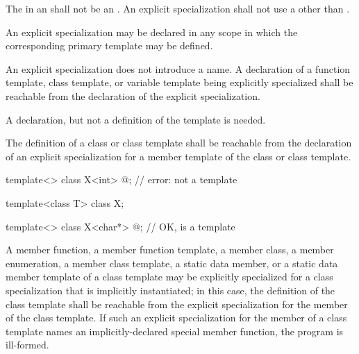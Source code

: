 \pnum
The  in an 
shall not be an .
An explicit specialization shall not use
a 
other than .

\pnum
An explicit specialization
may be declared in any scope in which the corresponding primary template
may be defined.

\pnum
An explicit specialization does not introduce a name.
A declaration of a function template, class template, or variable template being explicitly
specialized shall be reachable from the declaration of
the explicit specialization.
\begin{note}
A declaration, but not a definition of the template is needed.
\end{note}
The definition of a class or class template shall be reachable from the
declaration of an explicit specialization for a member template of the class
or class template.
\begin{example}
\begin{codeblock}
template<> class X<int> { @\commentellip@ };          // error:  not a template

template<class T> class X;

template<> class X<char*> { @\commentellip@ };        // OK,  is a template
\end{codeblock}
\end{example}

\pnum
A member function, a member function template, a member class,
a member enumeration, a
member class template,
a static data member, or a static data member template of a class template
may be explicitly specialized for a class specialization that is implicitly
instantiated;
in this case, the definition of the class template shall
be reachable from the explicit specialization for the member of the class
template.
If such an explicit specialization for the member of a class template names an
implicitly-declared special member function,
the program is ill-formed.

